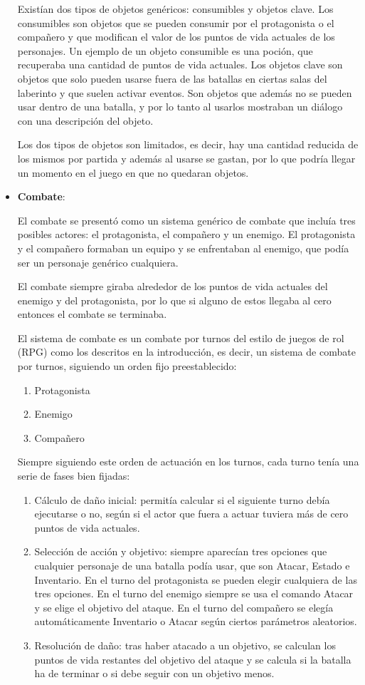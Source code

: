 \documentclass[12pt]{article}
\begin{document}
\begin{itemize}
	Existían dos tipos de objetos genéricos: consumibles y objetos clave. 
	Los consumibles son objetos que se pueden consumir por el protagonista o el compañero y que modifican el valor de los puntos de vida actuales de los personajes. Un ejemplo de un objeto consumible es una poción, que recuperaba una cantidad de puntos de vida actuales.
	Los objetos clave son objetos que solo pueden usarse fuera de las batallas en ciertas salas del laberinto y que suelen activar eventos. Son objetos que además no se pueden usar dentro de una batalla, y por lo tanto al usarlos mostraban un diálogo con una descripción del objeto.
	
	Los dos tipos de objetos son limitados, es decir, hay una cantidad reducida de los mismos por partida y además al usarse se gastan, por lo que podría llegar un momento en el juego en que no quedaran objetos.
		
	\item \textbf{Combate}:
	
	El combate se presentó como un sistema genérico de combate que incluía tres posibles actores: el protagonista, el compañero y un enemigo. El protagonista y el compañero formaban un equipo y se enfrentaban al enemigo, que podía ser un personaje genérico cualquiera.
	
	El combate siempre giraba alrededor de los puntos de vida actuales del enemigo y del protagonista, por lo que si alguno de estos llegaba al cero entonces el combate se terminaba.
	
	El sistema de combate es un combate por turnos del estilo de juegos de rol (RPG) como los descritos en la introducción, es decir, un sistema de combate por turnos, siguiendo un orden fijo preestablecido:
	\begin{enumerate}
		\item Protagonista
		\item Enemigo
		\item Compañero
	\end{enumerate} 

Siempre siguiendo este orden de actuación en los turnos, cada turno tenía una serie de fases bien fijadas:
\begin{enumerate}
	\item Cálculo de daño inicial: permitía calcular si el siguiente turno debía ejecutarse o no, según si el actor que fuera a actuar tuviera más de cero puntos de vida actuales.
	\item Selección de acción y objetivo: siempre aparecían tres opciones que cualquier personaje de una batalla podía usar, que son Atacar, Estado e Inventario.
	En el turno del protagonista se pueden elegir cualquiera de las tres opciones. En el turno del enemigo siempre se usa el comando Atacar y se elige el objetivo del ataque. En el turno del compañero se elegía automáticamente Inventario o Atacar según ciertos parámetros aleatorios.
	\item Resolución de daño: tras haber atacado a un objetivo, se calculan los puntos de vida restantes del objetivo del ataque y se calcula si la batalla ha de terminar o si debe seguir con un objetivo menos.
\end{enumerate} 


\end{itemize}
\end{document}
